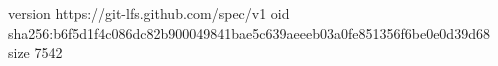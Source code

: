 version https://git-lfs.github.com/spec/v1
oid sha256:b6f5d1f4c086dc82b900049841bae5c639aeeeb03a0fe851356f6be0e0d39d68
size 7542
